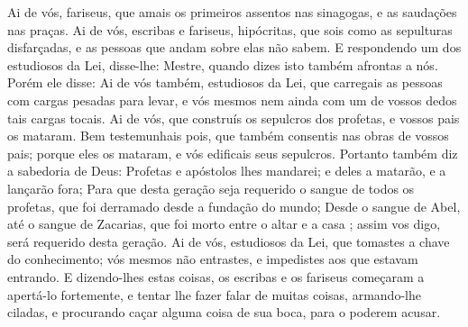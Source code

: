 {  Ai de vós, fariseus, que amais os primeiros assentos nas sinagogas, e as saudações nas praças.
  Ai de vós, escribas e fariseus, hipócritas, que sois como as sepulturas disfarçadas, e as pessoas que andam sobre elas não sabem.
  E respondendo um dos estudiosos da Lei, disse-lhe: Mestre, quando dizes isto também afrontas a nós.
  Porém ele disse: Ai de vós também, estudiosos da Lei, que carregais as pessoas com cargas pesadas para levar, e vós mesmos nem ainda com um de vossos dedos tais cargas tocais.
  Ai de vós, que construís os sepulcros dos profetas, e vossos pais os mataram.
  Bem testemunhais pois, que também consentis nas obras de vossos pais; porque eles os mataram, e vós edificais seus sepulcros.
  Portanto também diz a sabedoria de Deus: Profetas e apóstolos lhes mandarei; e deles a
{} matarão, e a
{} lançarão fora;
  Para que desta geração seja requerido o sangue de todos os profetas, que foi derramado desde a fundação do mundo;
  Desde o sangue de Abel, até o sangue de Zacarias, que foi morto entre o altar e a casa
{} ; assim vos digo, será requerido desta geração.
  Ai de vós, estudiosos da Lei, que tomastes a chave do conhecimento; vós mesmos não entrastes, e impedistes aos que estavam entrando.
  E dizendo-lhes estas coisas, os escribas e os fariseus começaram a apertá-lo fortemente, e tentar lhe fazer falar de muitas coisas,
  armando-lhe ciladas, e procurando caçar alguma coisa de sua boca, para o poderem acusar.
\par }

